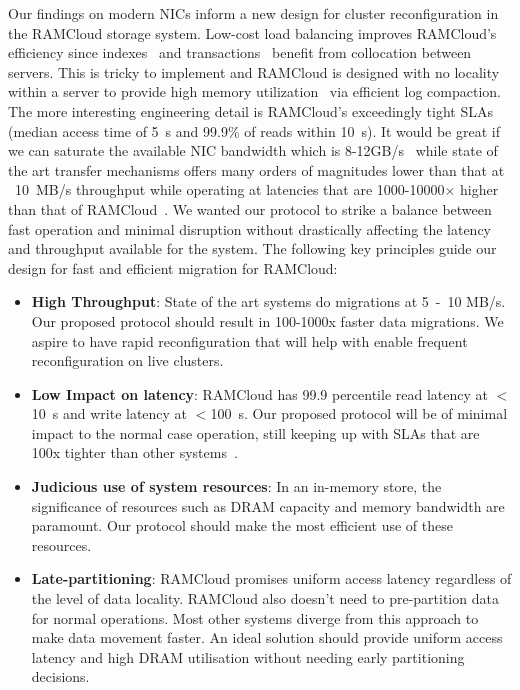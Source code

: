 Our findings on modern NICs inform a new design for cluster reconfiguration
in the RAMCloud storage system. Low-cost load balancing improves RAMCloud’s
efficiency since indexes~\cite{slik} and transactions~\cite{ramcloudtx} benefit from collocation between servers.
This is tricky to implement and RAMCloud is designed with no locality within a 
server to provide high memory utilization~\cite{ramcloudfast} via efficient log compaction.
The more interesting engineering detail is RAMCloud’s exceedingly tight SLAs (median
access time of 5\textmu~s and 99.9\% of reads within 10\textmu~s). It would be great if we can saturate the
available NIC bandwidth which is 8-12GB/s~\cite{cx3,cx4} while state of the art 
transfer mechanisms offers many orders of magnitudes lower than that at ~10~MB/s 
throughput while operating at latencies that are 1000-10000$\times$ higher than that of RAMCloud~\cite{ramcloud}.
We wanted our protocol to strike a balance between fast operation and minimal disruption without drastically affecting
the latency and throughput available for the system. The following key principles guide our design for fast and 
efficient migration for RAMCloud:
\begin{itemize}
\item{\textbf{High Throughput}}: State of the art systems do migrations at 5~-~10 MB/s. Our proposed protocol
should result in 100-1000x faster data migrations. We aspire to have rapid reconfiguration that will 
help with enable frequent reconfiguration on live clusters.
\item{\textbf{Low Impact on latency}}: RAMCloud has 99.9 percentile read latency at $<$10\textmu~s and write latency
at $<$100\textmu~s. Our proposed protocol will be of minimal impact to the normal case operation, still keeping
up with SLAs that are 100x tighter than other systems~\cite{squall}.
\item{\textbf{Judicious use of system resources}}: In an in-memory store, the significance of resources such as DRAM capacity and
memory bandwidth are paramount. Our protocol should make the most efficient use of these resources.
\item{\textbf{Late-partitioning}}: RAMCloud promises uniform access latency regardless of the level of data locality.
RAMCloud also doesn't need to pre-partition data for normal operations. Most other systems diverge from this 
approach to make data movement faster. An ideal solution should provide uniform access latency and high DRAM utilisation 
without needing early partitioning decisions.
\end{itemize}

